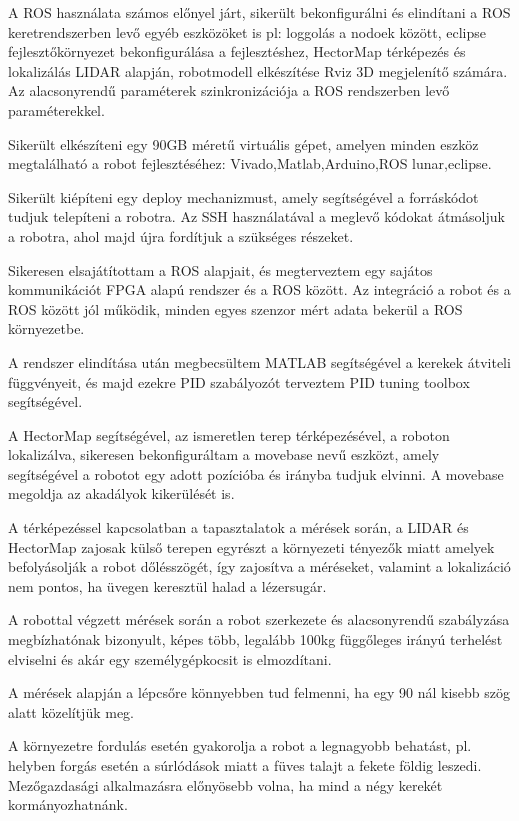 A ROS használata számos előnyel járt, sikerült bekonfigurálni és elindítani a ROS keretrendszerben levő egyéb eszközöket is pl: loggolás a nodoek között, eclipse fejlesztőkörnyezet bekonfigurálása a fejlesztéshez, HectorMap térképezés és lokalizálás LIDAR alapján, robotmodell elkészítése Rviz 3D megjelenítő számára. Az alacsonyrendű paraméterek szinkronizációja a ROS rendszerben levő paraméterekkel.

Sikerült elkészíteni egy 90GB méretű virtuális gépet, amelyen minden eszköz megtalálható a robot fejlesztéséhez: Vivado,Matlab,Arduino,ROS lunar,eclipse.

Sikerült kiépíteni egy deploy mechanizmust, amely segítségével a forráskódot tudjuk telepíteni a robotra. Az SSH használatával a meglevő kódokat átmásoljuk a robotra, ahol majd újra fordítjuk a szükséges részeket.

Sikeresen elsajátítottam a ROS alapjait, és megterveztem egy sajátos kommunikációt FPGA alapú rendszer és a ROS között. Az integráció a robot és a ROS között jól működik, minden egyes szenzor mért adata bekerül a ROS környezetbe.

A rendszer elindítása után megbecsültem MATLAB segítségével a kerekek átviteli függvényeit, és majd ezekre PID szabályozót terveztem PID tuning toolbox segítségével.

A HectorMap segítségével, az ismeretlen terep térképezésével, a roboton lokalizálva, sikeresen bekonfiguráltam a movebase nevű eszközt, amely segítségével a robotot egy adott pozícióba és irányba tudjuk elvinni. A movebase megoldja az akadályok kikerülését is.

A térképezéssel kapcsolatban a tapasztalatok a mérések során, a LIDAR és HectorMap zajosak külső terepen egyrészt a környezeti tényezők miatt amelyek befolyásolják a robot dőlésszögét, így zajosítva a méréseket, valamint a lokalizáció nem pontos, ha üvegen keresztül halad a lézersugár.

A robottal végzett mérések során a robot szerkezete és alacsonyrendű szabályzása megbízhatónak bizonyult, képes több, legalább 100kg függőleges irányú terhelést elviselni és akár egy személygépkocsit is elmozdítani.

A mérések alapján a lépcsőre könnyebben tud felmenni, ha egy 90 \degree nál kisebb szög alatt közelítjük meg.

A környezetre fordulás esetén gyakorolja a robot a legnagyobb behatást, pl. helyben forgás esetén a súrlódások miatt a füves talajt a fekete földig leszedi. Mezőgazdasági alkalmazásra előnyösebb volna, ha mind a négy kerekét kormányozhatnánk.

